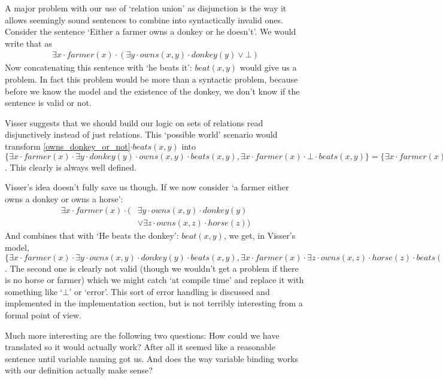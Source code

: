 \documentclass[12pt]{article}
\begin{document}
A major problem with our use of `relation union' as disjunction is the way it allows seemingly sound sentences to combine into syntactically invalid ones. Consider the sentence `Either a farmer owns a donkey or he doesn't'. We would write that as
\begin{align}
\exists x\cdot farmer(x)\cdot(\exists y\cdot owns(x,y)\cdot donkey(y)\vee \bot) \label{owns_donkey_or_not}
\end{align}
Now concatenating this sentence with `he beats it': $beat(x,y)$ would give us a problem. In fact this problem would be more than a syntactic problem, because before we know the model and the existence of the donkey, we don't know if the sentence is valid or not.

Visser\cite{visser1999donkey} suggests that we should build our logic on sets of relations read disjunctively instead of just relations. This `possible world' scenario would transform \eqref{owns_donkey_or_not}$\cdot beats(x,y)$ into $\{\exists x\cdot farmer(x)\cdot\exists y\cdot donkey(y)\cdot owns(x,y)\cdot beats(x,y), \exists x\cdot farmer(x)\cdot\bot\cdot beats(x,y)\} = \{\exists x\cdot farmer(x)\cdot\exists y\cdot donkey(y)\cdot owns(x,y)\cdot beats(x,y), \bot\}$. This clearly is always well defined.

Visser's idea doesn't fully save us though. If we now consider `a farmer either owns a donkey or owns a horse':
\begin{align}
\exists x\cdot farmer(x)\cdot(&\exists y\cdot owns(x,y)\cdot donkey(y)\nonumber\\
                              &\vee \exists z\cdot owns(x,z)\cdot horse(z))
\end{align}
And combines that with `He beats the donkey': $beat(x,y)$, we get, in Visser's model, $\{\exists x\cdot farmer(x)\cdot\exists y\cdot owns(x,y)\cdot donkey(y)\cdot beats(x,y), \exists x\cdot farmer(x)\cdot\exists z\cdot owns(x,z)\cdot horse(z)\cdot beats(x,y)\}$. The second one is clearly not valid (though we wouldn't get a problem if there is no horse or farmer) which we might catch `at compile time' and replace it with something like `$\bot$' or `error'. This sort of error handling is discussed and implemented in the implementation section, but is not terribly interesting from a formal point of view.

Much more interesting are the following two questions: How could we have translated \label{owns_donkey_or_horse} so it would actually work? After all it seemed like a reasonable sentence until variable naming got us. And does the way variable binding works with our definition actually make sense?
\end{document}
